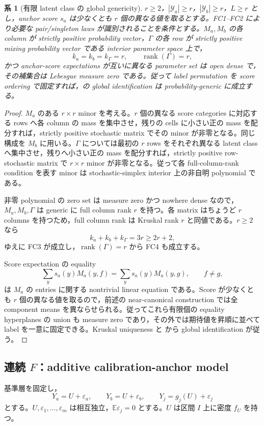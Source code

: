 \documentclass[11pt,a4paper]{ltjsarticle}
\newtheorem{corollary}{系}[section]
\theoremstyle{remark}
\newcommand{\E}{\mathbb E}
\newcommand{\cY}{\mathcal Y}
\newcommand{\rank}{\operatorname{rank}}
\begin{document}
\begin{corollary}[有限 latent class の global genericity]\label{cor:finiteclassgeneric}
$r\ge2$，$|\cY_a|\ge r$，$|\cY_b|\ge r$，$L\ge r$ とし，anchor score $s_a$ は少なくとも $r$ 個の異なる値を取るとする。FC1--FC2 により必要な pair/singleton laws が識別されることを条件とする。$M_a,M_b$ の各 column が strictly positive probability vector，$\Gamma$ の各 row が strictly positive mixing probability vector である interior parameter space 上で，
\[
k_a=k_b=k_\Gamma=r,
\qquad
\rank(\Gamma)=r,
\]
かつ anchor-score expectations が互いに異なる parameter set は open dense で，その補集合は Lebesgue measure zero である。従って label permutation を score ordering で固定すれば，の global identification は probability-generic に成立する。
\end{corollary}

\begin{proof}
$M_a$ のある $r\times r$ minor を考える。$r$ 個の異なる score categories に対応する rows へ各 column の mass を集中させ，残りの cells に小さい正の mass を配分すれば，strictly positive stochastic matrix でその minor が非零となる。同じ構成を $M_b$ に用いる。$\Gamma$ については最初の $r$ rows をそれぞれ異なる latent class へ集中させ，残りへ小さい正の mass を配分すれば，strictly positive row-stochastic matrix で $r\times r$ minor が非零となる。従って各 full-column-rank condition を表す minor は stochastic-simplex interior 上の非自明 polynomial である。

非零 polynomial の zero set は measure zero かつ nowhere dense なので，$M_a,M_b,\Gamma$ は generic に full column rank $r$ を持つ。各 matrix はちょうど $r$ columns を持つため，full column rank は Kruskal rank $r$ と同値である。$r\ge2$ なら
\[
k_a+k_b+k_\Gamma=3r\ge2r+2,
\]
ゆえに FC3 が成立し，$\rank(\Gamma)=r$ から FC4 も成立する。

Score expectation の equality
\[
\sum_y s_a(y)M_a(y,f)
=\sum_y s_a(y)M_a(y,g),\qquad f\ne g,
\]
は $M_a$ の entries に関する nontrivial linear equation である。Score が少なくとも $r$ 個の異なる値を取るので，前述の near-canonical construction では全 component means を異ならせられる。従ってこれら有限個の equality hyperplanes の union も measure zero であり，その外では期待値を昇順に並べて label を一意に固定できる。Kruskal uniqueness と から global identification が従う。
\end{proof}

\subsection{連続 \texorpdfstring{$F$}{F}：additive calibration-anchor model}
基準層を固定し，
\begin{equation}
Y_a=U+\varepsilon_a,
\qquad
Y_b=U+\varepsilon_b,
\qquad
Y_j=g_j(U)+\varepsilon_j
\label{eq:additive}
\end{equation}
とする。$U,\varepsilon_1,\ldots,\varepsilon_m$ は相互独立，$\E\varepsilon_j=0$ とする。$U$ は区間 $I$ 上に密度 $f_U$ を持つ。
\end{document}
